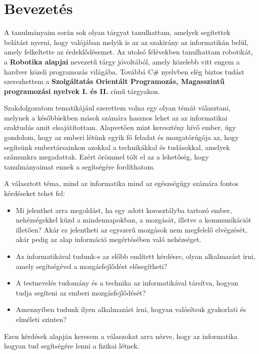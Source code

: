 \documentclass[tocnopagenum]{thesis-ekf}
\theoremstyle{definition}
\theoremstyle{remark}
\begin{document}
	\chapter{Bevezetés}
	\par
	A tanulmányaim során sok olyan tárgyat tanulhattam, amelyek segítettek belátást nyerni, hogy valójában melyik is az az szakirány az informatikán belül, amely felkeltette az érdeklődésemet. Az utolsó félévekben tanulhattam robotikát, a \textbf{Robotika alapjai} nevezetű tárgy jóvoltából, amely közelebb vitt engem a hardver közeli programozás világába. Továbbá C\# nyelvben elég biztos tudást szerezhettem a \textbf{Szolgáltatás Orientált Programozás, Magasszintű programozási nyelvek I. és II.} című tárgyakon.
	\par
	Szakdolgozatom tematikájául szerettem volna egy olyan témát választani, melynek a későbbiekben mások számára hasznos lehet az az informatikai szaktudás amit elsajátítottam.
	Alapvetően mint keresztény hívő ember, úgy gondolom, hogy az emberi létünk egyik fő feladat és mozgatórúgója az, hogy segítsünk embertársainkon azokkal a technikákkal és tudásokkal, amelyek számunkra megadattak. Ezért örömmel tölt el az a lehetőség, hogy tanulmányaimat ennek a segítségére fordíthatom. 
	\par
	A választott téma, mind az informatika mind az egészségügy számára fontos kérdéseket tehet fel:
	\begin{itemize}
		\item  Mi jelenthet arra megoldást, ha egy adott korosztályba tartozó ember, nehézségekkel küzd a mindennapokban, a mozgását, illetve a kommunikációt illetően? Akár ez jelentheti az egyszerű mozgások nem megfelelő elvégzését, akár pedig az alap információ megértésében való nehézséget.
		\item  Az informatikával tudunk-e az előbb említett kérdésre, olyan alkalmazást írni, amely segítségével a mozgásfejlődést elősegítheti?
		\item A testnevelés tudomány és a technika az informatikával társítva, hogyan tudja segíteni az emberi mozgásfejlődését?
		\item Amennyiben tudunk ilyen alkalmazást írni, hogyan valósítsuk gyakorlati és elméleti szinten?
	
	\end{itemize}
 	Ezen kérdések alapján keresem a válaszokat arra nézve, hogy az informatika hogyan tud segítségére lenni a fizikai létnek. 
 
\end{document}
